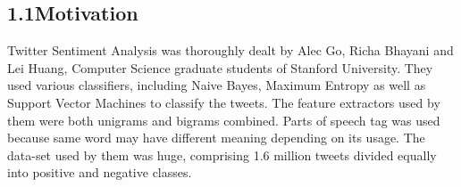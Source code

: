\documentclass[12pt]{article}
\begin{document}
\vspace{\baselineskip}

\vspace{\baselineskip}

\vspace{\baselineskip}

\vspace{\baselineskip}

\vspace{\baselineskip}

\vspace{\baselineskip}

\vspace{\baselineskip}

\vspace{\baselineskip}

\vspace{\baselineskip}

\vspace{\baselineskip}

\vspace{\baselineskip}

\vspace{\baselineskip}
\subsection*{1.1\hspace*{10pt}Motivation}
\begin{justify}
Twitter Sentiment Analysis was thoroughly dealt by Alec Go, Richa Bhayani and Lei Huang, Computer Science graduate students of Stanford University. They used various classifiers, including Naive Bayes, Maximum Entropy as well as Support Vector Machines to classify the tweets. The feature extractors used by them were both unigrams and bigrams combined. Parts of speech tag was used because same word may have different meaning depending on its usage. The data-set used by them was huge, comprising 1.6 million tweets divided equally into positive and negative classes.
\end{justify}\par
\end{document}
